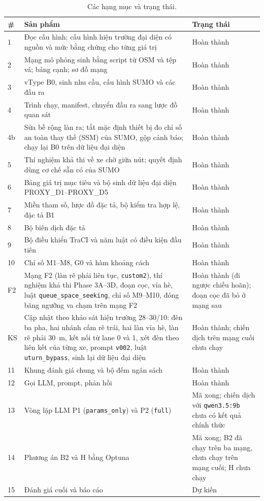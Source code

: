 \documentclass[../DoAn.tex]{subfiles}
\begin{document}
\begin{table}[H]
\centering
\small
\caption{Các hạng mục và trạng thái.}
\label{table:4.4}
\begin{tabular}{|p{0.8cm}|p{9.6cm}|p{2.6cm}|}
\hline
\textbf{\#} & \textbf{Sản phẩm} & \textbf{Trạng thái} \\ \hline
1 & Đọc cấu hình; cấu hình hiện trường đại diện có nguồn và mức bằng chứng cho từng giá trị & Hoàn thành \\ \hline
2 & Mạng mô phỏng sinh bằng script từ OSM và tệp vá; bảng cạnh; sơ đồ mạng & Hoàn thành \\ \hline
3 & vType B0, sinh nhu cầu, cấu hình SUMO và các đầu ra & Hoàn thành \\ \hline
4 & Trình chạy, manifest, chuyển đầu ra sang lược đồ quan sát & Hoàn thành \\ \hline
4b & Sửa bề rộng làn ra; tắt mặc định thiết bị đo chỉ số an toàn thay thế (SSM) của SUMO, gộp cảnh báo; chạy lại B0 trên dữ liệu đại diện & Hoàn thành \\ \hline
5 & Thí nghiệm khả thi về xe chờ giữa nút; quyết định dùng cơ chế sẵn có của SUMO & Hoàn thành \\ \hline
6 & Bảng giá trị mục tiêu và bộ sinh dữ liệu đại diện PROXY\_D1--PROXY\_D5 & Hoàn thành \\ \hline
7 & Miền tham số, lược đồ đặc tả, bộ kiểm tra hợp lệ, đặc tả B1 & Hoàn thành \\ \hline
8 & Bộ biên dịch đặc tả & Hoàn thành \\ \hline
9 & Bộ điều khiển TraCI và năm luật có điều kiện đầu tiên & Hoàn thành \\ \hline
10 & Chỉ số M1--M8, G0 và hàm khoảng cách & Hoàn thành \\ \hline
F2 & Mạng F2 (làn rẽ phải liên tục, \texttt{custom2}), thí nghiệm khả thi Phase 3A--3D, đoạn cọc, vỉa hè, luật \texttt{queue\_space\_seeking}, chỉ số M9--M10, đóng băng ngưỡng va chạm trên mạng F2 & Hoàn thành (đi ngược chiều hoãn); đoạn cọc đã bỏ ở mạng sau \\ \hline
KS & Cập nhật theo khảo sát hiện trường 28--30/10: đèn ba pha, hai nhánh cấm rẽ trái, hai làn vỉa hè, làn rẽ phải 30~m, kết nối từ lane 0 và 1, xét đèn theo liên kết của từng xe, prompt \texttt{v002}, luật \texttt{uturn\_bypass}, sinh lại dữ liệu đại diện & Hoàn thành; chiến dịch trên mạng cuối chưa chạy \\ \hline
11 & Khung đánh giá chung và bộ đếm ngân sách & Hoàn thành \\ \hline
12 & Gọi LLM, prompt, phản hồi & Hoàn thành \\ \hline
13 & Vòng lặp LLM P1 (\texttt{params\_only}) và P2 (\texttt{full}) & Mã xong; chiến dịch với \texttt{qwen3.5:9b} chưa có kết quả chính thức \\ \hline
14 & Phương án B2 và H bằng Optuna & Mã xong; B2 đã chạy trên ba mạng, chưa chạy trên mạng cuối; H chưa chạy \\ \hline
15 & Đánh giá cuối và báo cáo & Dự kiến \\ \hline
\end{tabular}
\end{table}
\end{document}
